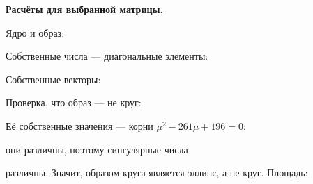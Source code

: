 \documentclass[a4paper,14pt]{extarticle}
\begin{document}
\textbf{Расчёты для выбранной матрицы.} \begin{center}\end{center} Ядро и образ: \begin{center}\end{center} Собственные числа --- диагональные элементы: \begin{center}\end{center} Собственные векторы: \begin{center}\end{center} \begin{center}\end{center} Проверка, что образ --- не круг: \begin{center}\end{center} Её собственные значения --- корни \(\mu^2-261\mu+196=0\): \begin{center}\end{center} они различны, поэтому сингулярные числа \begin{center}\end{center} различны. Значит, образом круга является эллипс, а не круг. Площадь:
\begin{center}\end{center}
\end{document}
